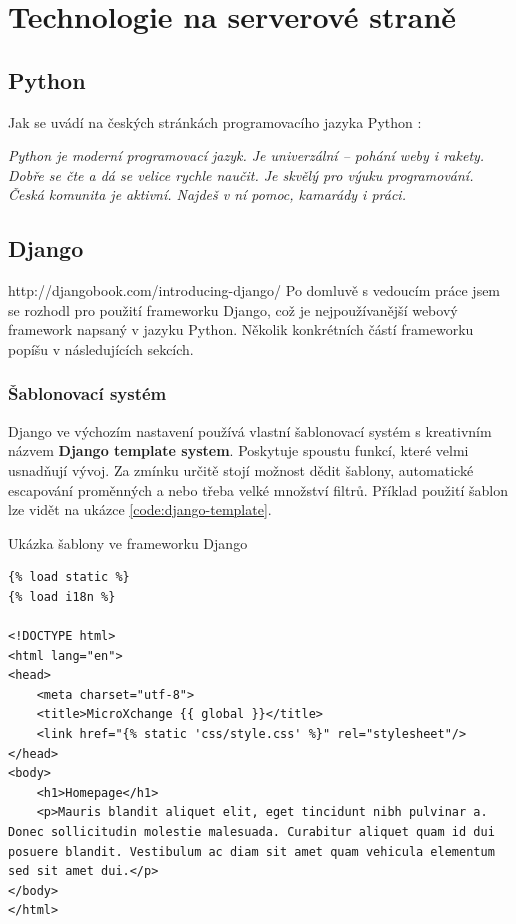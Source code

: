 \section{Technologie na serverové straně}
\subsection{Python}
Jak se uvádí na českých stránkách programovacího jazyka Python \cite{python-cz}:

\begin{center}
\textit{Python je moderní programovací jazyk. Je univerzální – pohání weby i rakety. Dobře se čte a dá se velice rychle naučit. Je skvělý pro výuku programování. Česká komunita je aktivní. Najdeš v ní pomoc, kamarády i práci.}
\end{center}

\subsection{Django}
http://djangobook.com/introducing-django/
Po domluvě s vedoucím práce jsem se rozhodl pro použití frameworku Django, což je nejpoužívanější webový framework napsaný v jazyku Python. Několik konkrétních částí frameworku popíšu v následujících sekcích.

\subsubsection{Šablonovací systém}
Django ve výchozím nastavení používá vlastní šablonovací systém s kreativním názvem \textbf{Django template system}. Poskytuje spoustu funkcí, které velmi usnadňují vývoj. Za zmínku určitě stojí možnost dědit šablony, automatické escapování proměnných a nebo třeba velké množství filtrů. Příklad použití šablon lze vidět na ukázce \ref{code:django-template}.

\begin{listing}[htbp]
\caption{\label{code:django-template}Ukázka šablony ve frameworku Django}
\begin{verbatim}
{% load static %}
{% load i18n %}

<!DOCTYPE html>
<html lang="en">
<head>
    <meta charset="utf-8">
    <title>MicroXchange {{ global }}</title>
    <link href="{% static 'css/style.css' %}" rel="stylesheet"/>
</head>
<body>
    <h1>Homepage</h1>
    <p>Mauris blandit aliquet elit, eget tincidunt nibh pulvinar a. Donec sollicitudin molestie malesuada. Curabitur aliquet quam id dui posuere blandit. Vestibulum ac diam sit amet quam vehicula elementum sed sit amet dui.</p>
</body>
</html>
\end{verbatim}
\end{listing}

